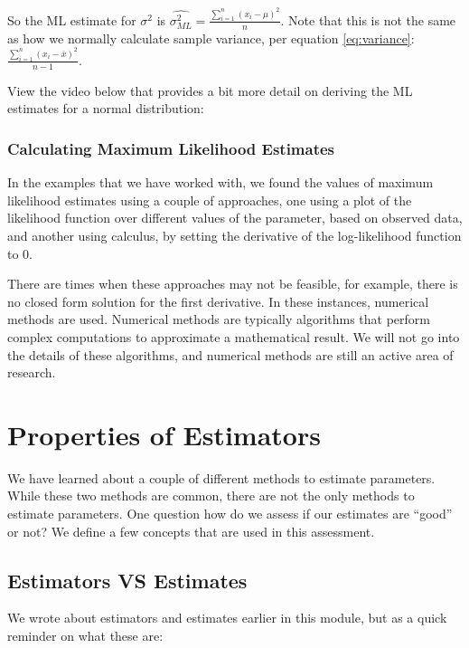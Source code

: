 \documentclass[
]{book}
\begin{document}
So the ML estimate for \(\sigma^2\) is \(\hat{\sigma_{ML}^2} = \frac{\sum_{i=1}^n (x_i - \mu)^2}{n}\). Note that this is not the same as how we normally calculate sample variance, per equation \eqref{eq:variance}: \(\frac{\sum_{i=1}^n (x_i-\bar{x})^2}{n-1}\).

View the video below that provides a bit more detail on deriving the ML estimates for a normal distribution:

\hypertarget{calculating-maximum-likelihood-estimates}{%
\subsubsection{Calculating Maximum Likelihood Estimates}\label{calculating-maximum-likelihood-estimates}}

In the examples that we have worked with, we found the values of maximum likelihood estimates using a couple of approaches, one using a plot of the likelihood function over different values of the parameter, based on observed data, and another using calculus, by setting the derivative of the log-likelihood function to 0.

There are times when these approaches may not be feasible, for example, there is no closed form solution for the first derivative. In these instances, numerical methods are used. Numerical methods are typically algorithms that perform complex computations to approximate a mathematical result. We will not go into the details of these algorithms, and numerical methods are still an active area of research.

\hypertarget{estprops}{%
\section{Properties of Estimators}\label{estprops}}

We have learned about a couple of different methods to estimate parameters. While these two methods are common, there are not the only methods to estimate parameters. One question how do we assess if our estimates are ``good'' or not? We define a few concepts that are used in this assessment.

\hypertarget{estimators-vs-estimates}{%
\subsection{Estimators VS Estimates}\label{estimators-vs-estimates}}

We wrote about estimators and estimates earlier in this module, but as a quick reminder on what these are:
\end{document}
